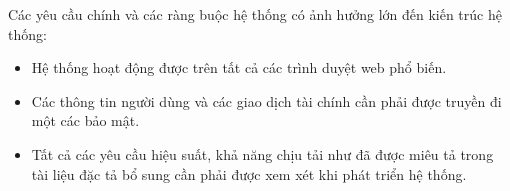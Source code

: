 \documentclass[./../main_file.tex]{subfiles}
\begin{document}
	Các yêu cầu chính và các ràng buộc hệ thống có ảnh hưởng lớn đến kiến trúc hệ thống:
	\begin{itemize}
		\item Hệ thống hoạt động được trên tất cả các trình duyệt web phổ biến.
		\item Các thông tin người dùng và các giao dịch tài chính cần phải được truyền đi một các bảo mật.
		\item Tất cả các yêu cầu hiệu suất, khả năng chịu tải như đã được miêu tả trong tài liệu đặc tả bổ sung cần phải được xem xét khi phát triển hệ thống.
	\end{itemize}
	
	
\end{document}
